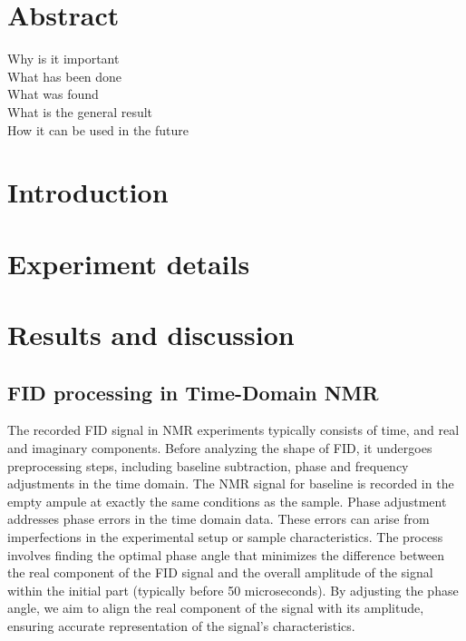 \documentclass[a4paper,12pt]{article}
\begin{document}
\maketitle %
\section*{Abstract}

Why is it important\\
What has been done\\
What was found\\
What is the general result\\
How it can be used in the future\\

\newpage
\section{Introduction}

\newpage
\section{Experiment details}

\newpage
\section{Results and discussion}\label{sec:Results and discussion}
\subsection{FID processing in Time-Domain NMR}\label{sec:FID processing in Time-Domain NMR}

The recorded FID signal in NMR experiments typically consists of time, and real and imaginary components. 
Before analyzing the shape of FID, it undergoes preprocessing steps, including baseline subtraction, phase and frequency adjustments in the time domain.
The NMR signal for baseline is recorded in the empty ampule at exactly the same conditions as the sample. 
Phase adjustment addresses phase errors in the time domain data. 
These errors can arise from imperfections in the experimental setup or sample characteristics. 
The process involves finding the optimal phase angle that minimizes the difference between the real component of the FID signal and the overall amplitude of the signal within the initial part (typically before 50 microseconds). 
By adjusting the phase angle, we aim to align the real component of the signal with its amplitude, ensuring accurate representation of the signal's characteristics.
\end{document}
